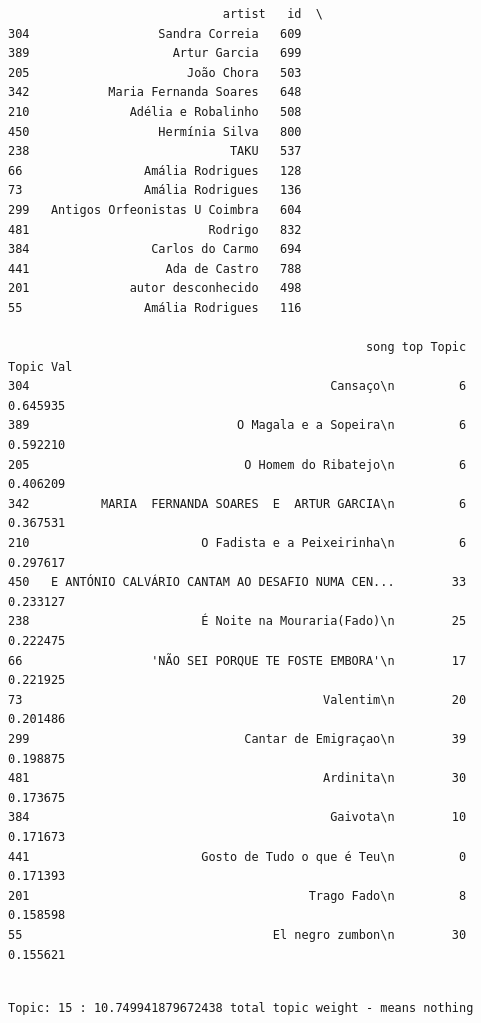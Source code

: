\documentclass[11pt]{article}
\begin{document}
    
    \begin{verbatim}
                              artist   id  \
304                  Sandra Correia   609   
389                    Artur Garcia   699   
205                      João Chora   503   
342           Maria Fernanda Soares   648   
210              Adélia e Robalinho   508   
450                  Hermínia Silva   800   
238                            TAKU   537   
66                 Amália Rodrigues   128   
73                 Amália Rodrigues   136   
299   Antigos Orfeonistas U Coimbra   604   
481                         Rodrigo   832   
384                 Carlos do Carmo   694   
441                   Ada de Castro   788   
201              autor desconhecido   498   
55                 Amália Rodrigues   116   

                                                  song top Topic  Topic Val  
304                                          Cansaço\n         6   0.645935  
389                             O Magala e a Sopeira\n         6   0.592210  
205                              O Homem do Ribatejo\n         6   0.406209  
342          MARIA  FERNANDA SOARES  E  ARTUR GARCIA\n         6   0.367531  
210                        O Fadista e a Peixeirinha\n         6   0.297617  
450   E ANTÓNIO CALVÁRIO CANTAM AO DESAFIO NUMA CEN...        33   0.233127  
238                        É Noite na Mouraria(Fado)\n        25   0.222475  
66                  'NÃO SEI PORQUE TE FOSTE EMBORA'\n        17   0.221925  
73                                          Valentim\n        20   0.201486  
299                              Cantar de Emigraçao\n        39   0.198875  
481                                         Ardinita\n        30   0.173675  
384                                          Gaivota\n        10   0.171673  
441                        Gosto de Tudo o que é Teu\n         0   0.171393  
201                                       Trago Fado\n         8   0.158598  
55                                   El negro zumbon\n        30   0.155621  
    \end{verbatim}

    
    \begin{Verbatim}[commandchars=\\\{\}]

Topic: 15 : 10.749941879672438 total topic weight - means nothing

    \end{Verbatim}
\end{document}
